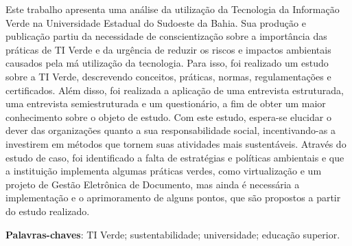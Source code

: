 \setlength{\absparsep}{18pt} %
\begin{resumo}

 Este trabalho apresenta uma análise da utilização da Tecnologia da Informação Verde na Universidade Estadual do Sudoeste da Bahia. Sua produção e publicação partiu da necessidade de conscientização sobre a importância das práticas de TI Verde e da urgência de reduzir os riscos e impactos ambientais causados pela má utilização da tecnologia. Para isso, foi realizado um estudo sobre a TI Verde, descrevendo conceitos, práticas, normas, regulamentações e certificados. Além disso, foi realizada a aplicação de uma entrevista estruturada, uma entrevista semiestruturada e um questionário, a fim de obter um maior conhecimento sobre o objeto de estudo. Com este estudo, espera-se elucidar o dever das organizações quanto a sua responsabilidade social, incentivando-as  a investirem em métodos que tornem suas atividades mais sustentáveis. Através do estudo de caso, foi identificado a falta de estratégias e políticas ambientais e que a instituição implementa algumas práticas verdes, como virtualização e um projeto de Gestão Eletrônica de Documento, mas ainda é necessária a implementação e o aprimoramento de alguns pontos, que são propostos a partir do estudo realizado.

 \textbf{Palavras-chaves}: TI Verde; sustentabilidade; universidade; educação superior.
\end{resumo}